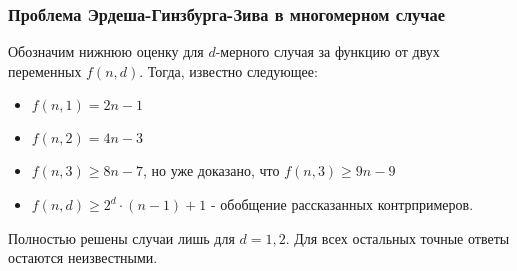 \subsubsection*{Проблема Эрдеша-Гинзбурга-Зива в многомерном случае}

Обозначим нижнюю оценку для $d$-мерного случая за функцию от двух переменных $f(n, d)$. Тогда, известно следующее:
\begin{itemize}
	\item \(f(n, 1) = 2n - 1\)
	
	\item \(f(n, 2) = 4n - 3\)
	
	\item \(f(n, 3) \ge 8n - 7\), но уже доказано, что $f(n, 3) \ge 9n - 9$
	
	\item \(f(n, d) \ge 2^d \cdot (n - 1) + 1\) - обобщение рассказанных контрпримеров.
\end{itemize}
Полностью решены случаи лишь для $d = 1, 2$. Для всех остальных точные ответы остаются неизвестными.